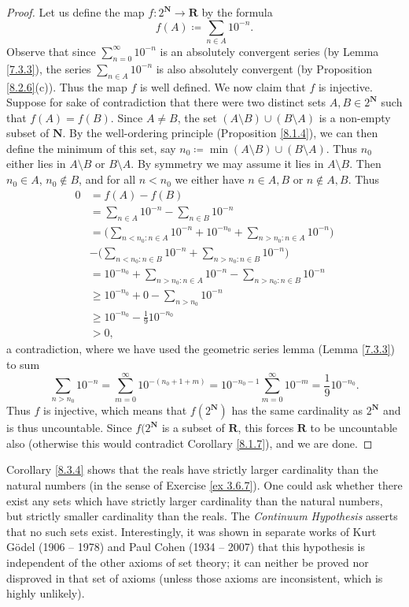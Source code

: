 \begin{proof}
Let us define the map \(f : 2^{\mathbf{N}} \to \mathbf{R}\) by the formula
\[
    f(A) \coloneqq \sum_{n \in A} 10^{-n}.
\]
Observe that since \(\sum_{n = 0}^\infty 10^{-n}\) is an absolutely convergent series (by Lemma \ref{7.3.3}), the series \(\sum_{n \in A} 10^{-n}\) is also absolutely convergent (by Proposition \ref{8.2.6}(c)).
Thus the map \(f\)  is well defined.
We now claim that \(f\) is injective.
Suppose for sake of contradiction that there were two distinct sets \(A, B \in 2^{\mathbf{N}}\) such that \(f(A) = f(B)\).
Since \(A \neq B\), the set \((A \setminus B) \cup (B \setminus A)\) is a non-empty subset of \(\mathbf{N}\).
By the well-ordering principle (Proposition \ref{8.1.4}), we can then define the minimum of this set, say \(n_0 \coloneqq \min(A \setminus B) \cup (B \setminus A)\).
Thus \(n_0\) either lies in \(A \setminus B\) or \(B \setminus A\).
By symmetry we may assume it lies in \(A \setminus B\).
Then \(n_0 \in A\), \(n_0 \notin B\), and for all \(n < n_0\) we either have \(n \in A, B\) or \(n \notin A, B\).
Thus
\begin{align*}
0 &= f(A) - f(B) \\
&= \sum_{n \in A} 10^{-n} - \sum_{n \in B} 10^{-n} \\
&= \Bigg(\sum_{n < n_0 : n \in A} 10^{-n} + 10^{-n_0} + \sum_{n > n_0 : n \in A} 10^{-n}\Bigg) \\
& - \Bigg(\sum_{n < n_0 : n \in B} 10^{-n} + \sum_{n > n_0 : n \in B} 10^{-n}\Bigg) \\
&= 10^{-n_0} + \sum_{n > n_0 : n \in A} 10^{-n} - \sum_{n > n_0 : n \in B} 10^{-n} \\
&\geq 10^{-n_0} + 0 - \sum_{n > n_0} 10^{-n} \\
&\geq 10^{-n_0} - \frac{1}{9} 10^{-n_0} \\
&> 0,
\end{align*}
a contradiction, where we have used the geometric series lemma (Lemma \ref{7.3.3}) to sum
\[
    \sum_{n > n_0} 10^{-n} = \sum_{m = 0}^\infty 10^{-(n_0 + 1 + m)} = 10^{-n_0 - 1} \sum_{m = 0}^\infty 10^{-m} = \frac{1}{9} 10^{-n_0}.
\]
Thus \(f\) is injective, which means that \(f(2^{\mathbf{N}})\) has the same cardinality as \(2^{\mathbf{N}}\) and is thus uncountable.
Since \(f(2^{\mathbf{N}}\) is a subset of \(\mathbf{R}\), this forces \(\mathbf{R}\) to be uncountable also (otherwise this would contradict Corollary \ref{8.1.7}), and we are done.
\end{proof}

\setcounter{theorem}{5}
\begin{remark}\label{8.3.6}
Corollary \ref{8.3.4} shows that the reals have strictly larger cardinality than the natural numbers (in the sense of Exercise \ref{ex 3.6.7}).
One could ask whether there exist any sets which have strictly larger cardinality than the natural numbers, but strictly smaller cardinality than the reals.
The \emph{Continuum Hypothesis} asserts that no such sets exist.
Interestingly, it was shown in separate works of Kurt Gödel (1906 -- 1978) and Paul Cohen (1934 -- 2007) that this hypothesis is independent of the other axioms of set theory;
it can neither be proved nor disproved in that set of axioms
(unless those axioms are inconsistent, which is highly unlikely).
\end{remark}